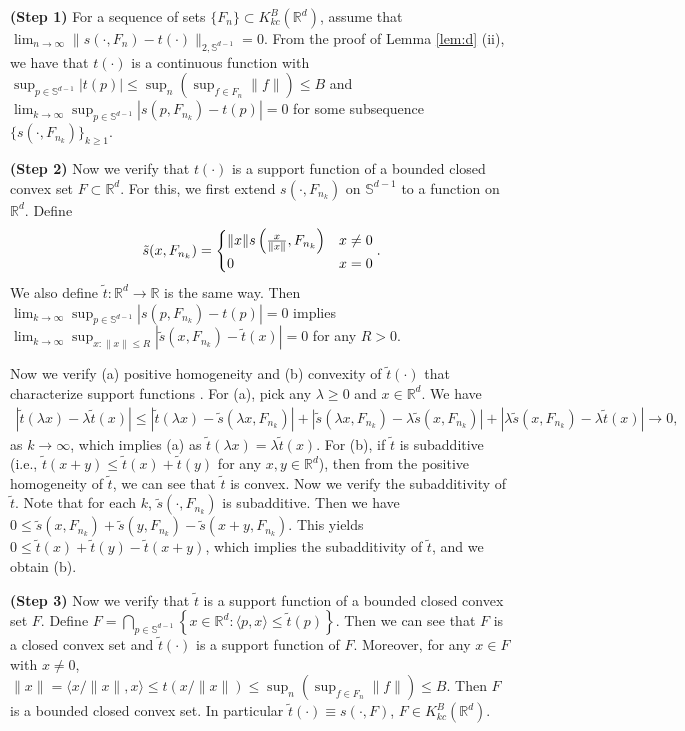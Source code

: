 \documentclass[11pt,reqno]{amsart}
\begin{document}
\noindent
\textbf{(Step 1)} For a sequence of sets $\{F_n\} \subset K_{kc}^B(\mathbb{R}^d)$, assume that $\lim_{n \to \infty}\|s(\cdot,F_n) -t(\cdot)\|_{2,\mathbb{S}^{d-1}} = 0$. From the proof of Lemma \ref{lem:d} (ii), we have that $t(\cdot)$ is a continuous function with $\sup_{p \in \mathbb{S}^{d-1}}|t(p)|\leq \sup_n(\sup_{f \in F_n}\|f\|)\leq B$ and $\lim_{k \to \infty}\sup_{p \in \mathbb{S}^{d-1}}|s(p,F_{n_k}) - t(p)| = 0$ for some subsequence $\{s(\cdot, F_{n_k})\}_{k \geq 1}$. 

\noindent
\textbf{(Step 2)} Now we verify that $t(\cdot)$ is a support function of a bounded closed convex set $F \subset \mathbb{R}^d$. For this, we first extend $s(\cdot, F_{n_k})$ on $\mathbb{S}^{d-1}$ to a function on $\mathbb{R}^d$. Define 
\[
\tilde{s}(x, F_{n_k}) = 
\begin{cases}
\|x\|s\left({x \over \|x\|}, F_{n_k}\right) & x \neq 0\\
0 & x = 0 
\end{cases}.
\]
We also define $\tilde{t}: \mathbb{R}^d \to \mathbb{R}$ is the same way. Then $\lim_{k \to \infty}\sup_{p \in \mathbb{S}^{d-1}}|s(p,F_{n_k}) - t(p)| = 0$ implies $\lim_{k \to \infty}\sup_{x:\|x\|\leq R}|\tilde{s}(x,F_{n_k}) - \tilde{t}(x)| = 0$ for any $R>0$. 

Now we verify (a) positive homogeneity and (b) convexity of $\tilde{t}(\cdot)$ that characterize support functions \citep{Sc14}. For (a), pick any $\lambda \geq 0$ and $x \in \mathbb{R}^d$. We have 
\begin{align*}
|\tilde{t}(\lambda x) - \lambda \tilde{t}(x)| \leq |\tilde{t}(\lambda x) - \tilde{s}(\lambda x, F_{n_k})| + |\tilde{s}(\lambda x, F_{n_k}) - \lambda\tilde{s}(x, F_{n_k})| + |\lambda \tilde{s}(x, F_{n_k}) - \lambda \tilde{t}(x)| \to 0,
\end{align*} 
as $k \to \infty$, which implies (a) as $\tilde{t}(\lambda x) = \lambda \tilde{t}(x)$. For (b), if $\tilde{t}$ is subadditive (i.e., $\tilde{t}(x+y) \leq \tilde{t}(x) + \tilde{t}(y)$ for any $x, y \in \mathbb{R}^d$), then from the positive homogeneity of $\tilde{t}$, we can see that $\tilde{t}$ is convex. Now we verify the subadditivity of $\tilde{t}$. Note that for each $k$, $\tilde{s}(\cdot, F_{n_k})$ is subadditive. Then we have $0 \leq \tilde{s}(x, F_{n_k}) + \tilde{s}(y, F_{n_k})  - \tilde{s}(x+y, F_{n_k})$. This yields $0 \leq \tilde{t}(x) + \tilde{t}(y)  - \tilde{t}(x+y)$, which implies the subadditivity of $\tilde{t}$, and we obtain (b).

\noindent
\textbf{(Step 3)} Now we verify that $\tilde{t}$ is a support function of a bounded closed convex set $F$. Define $F = \bigcap_{p \in \mathbb{S}^{d-1}}\left\{x \in \mathbb{R}^d: \langle p, x \rangle \leq  \tilde{t}(p)\right\}$. Then we can see that $F$ is a closed convex set and $\tilde{t}(\cdot)$ is a support function of $F$. Moreover, for any $x \in F$ with $x \neq 0$, $\|x\|=\langle x/\|x\|, x \rangle \leq t(x/\|x\|) \leq \sup_n (\sup_{f \in F_n}\|f\|) \leq B$. Then $F$ is a bounded closed convex set. In particular $\tilde{t}(\cdot) \equiv s(\cdot, F)$, $F \in K_{kc}^B(\mathbb{R}^d)$. 
\end{document}

